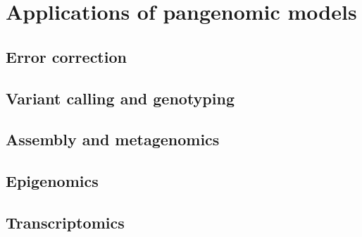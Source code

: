 \section{Applications of pangenomic models}

\subsection{Error correction}

\subsection{Variant calling and genotyping}

\subsection{Assembly and metagenomics}

\subsection{Epigenomics}

\subsection{Transcriptomics}
